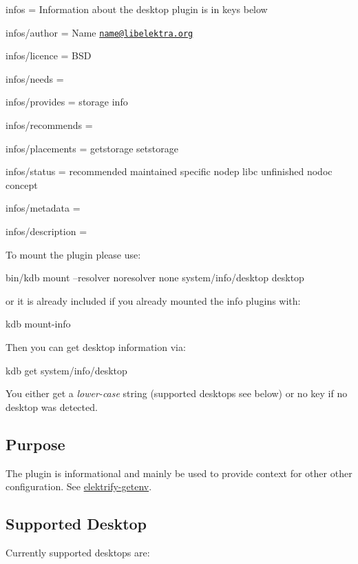 
\begin{DoxyItemize}
\item infos = Information about the desktop plugin is in keys below
\item infos/author = Name \href{mailto:name@libelektra.org}{\tt name@libelektra.\+org}
\item infos/licence = B\+S\+D
\item infos/needs =
\item infos/provides = storage info
\item infos/recommends =
\item infos/placements = getstorage setstorage
\item infos/status = recommended maintained specific nodep libc unfinished nodoc concept
\item infos/metadata =
\item infos/description =
\end{DoxyItemize}

To mount the plugin please use\+: \begin{DoxyVerb}bin/kdb mount --resolver noresolver none system/info/desktop desktop
\end{DoxyVerb}


or it is already included if you already mounted the info plugins with\+: \begin{DoxyVerb}kdb mount-info
\end{DoxyVerb}


Then you can get desktop information via\+: \begin{DoxyVerb}kdb get system/info/desktop
\end{DoxyVerb}


You either get a {\itshape lower-\/case} string (supported desktops see below) or no key if no desktop was detected.

\subsection*{Purpose}

The plugin is informational and mainly be used to provide context for other other configuration. See \hyperlink{md_src_libs_getenv_README_src_libs_getenv_README_md}{elektrify-\/getenv}.

\subsection*{Supported Desktop}

Currently supported desktops are\+:



